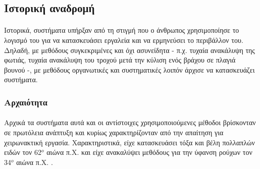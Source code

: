 \documentclass[a4paper,12pt,twoside]{report}
\begin{document}
		\subsection{Ιστορική αναδρομή}
		
			\paragraph{}{Ιστορικά, συστήματα υπήρξαν από τη στιγμή που ο άνθρωπος χρησιμοποίησε το λογισμό του για να κατασκευάσει εργαλεία και να ερμηνεύσει το περιβάλλον του. Δηλαδή, με μεθόδους συγκεκριμένες και όχι ασυνείδητα - π.χ. τυχαία ανακάλυψη της φωτιάς, τυχαία ανακάλυψη του τροχού μετά την κύλιση ενός βράχου σε πλαγιά βουνού -, με μεθόδους οργανωτικές και συστηματικές λοιπόν άρχισε να κατασκευάζει συστήματα.
			}
			
		\subsubsection{Αρχαιότητα}
			\paragraph{}{Αρχικά τα συστήματα αυτά και οι αντίστοιχες χρησιμοποιούμενες μέθοδοι βρίσκονταν σε πρωτόλεια ανάπτυξη και κυρίως χαρακτηρίζονταν από την απαίτηση για χειρωνακτική εργασία. Χαρακτηριστικά, είχε κατασκευάσει τόξα και βέλη πολλαπλών ειδών τον 62$^{ο}$ αιώνα π.Χ. \cite{ClothesMakeTheHuMan} και είχε ανακαλύψει μεθόδους για την ύφανση ρούχων τον 34$^{ο}$ αιώνα π.Χ. \cite{MiddleStoneAgeBoneToolsFromTheHowiesonsPoortLayers}. 
			}
\end{document}
